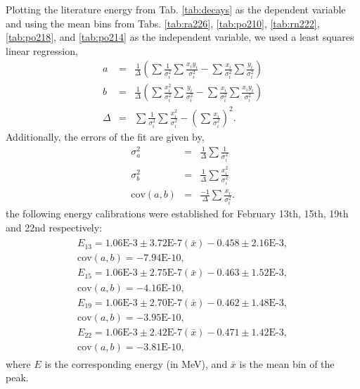 \documentclass[10pt]{IEEEtran}
\begin{document}
Plotting the literature energy from Tab. \ref{tab:decays} as the dependent variable and using the mean bins from Tabs. \ref{tab:ra226}, \ref{tab:po210}, \ref{tab:rn222}, \ref{tab:po218}, and \ref{tab:po214} as the independent variable, we used a least squares linear regression\cite{bevington},
\begin{eqnarray}
a &=& \frac{1}{\Delta}\left(\sum\frac{1}{\sigma_i^2}\sum\frac{x_i y_i}{\sigma_i^2}-\sum \frac{x_i}{\sigma_i^2}\sum\frac{y_i}{\sigma_i^2}\right) \\
b &=& \frac{1}{\Delta}\left(\sum\frac{x_i^2}{\sigma_i^2}\sum\frac{y_i}{\sigma_i^2}-\sum\frac{x_i}{\sigma_i^2}\sum\frac{x_i y_i}{\sigma_i^2}\right) \\
\Delta &=& \sum\frac{1}{\sigma_i^2}\sum\frac{x_i^2}{\sigma_i^2}-\left(\sum\frac{x_i}{\sigma_i^2}\right)^2.
\end{eqnarray}
Additionally, the errors of the fit are given by\cite{bevington},
\begin{eqnarray}
\sigma_a^2 &=& \frac{1}{\Delta}\sum\frac{1}{\sigma_i^2} \\
\sigma_b^2 &=& \frac{1}{\Delta}\sum\frac{x_i^2}{\sigma_i^2} \\
\text{cov}(a,b) &=& \frac{-1}{\Delta}\sum\frac{x_i}{\sigma_i^2}.
\end{eqnarray}
the following energy calibrations were established for February 13th, 15th, 19th and 22nd respectively:
\begin{eqnarray}\begin{array}{c}
E_{13} = 1.06\text{E-}3\pm 3.72\text{E-}7(\bar{x})-0.458\pm 2.16\text{E-}3, \\
\text{cov}(a,b) = -7.94\text{E-}10, \\
E_{15} = 1.06\text{E-}3\pm 2.75\text{E-}7(\bar{x})-0.463\pm 1.52\text{E-}3, \\
\text{cov}(a,b) = -4.16\text{E-}10, \\
E_{19} = 1.06\text{E-}3\pm 2.70\text{E-}7(\bar{x})-0.462\pm 1.48\text{E-}3, \\
\text{cov}(a,b) = -3.95\text{E-}10, \\
E_{22} = 1.06\text{E-}3\pm 2.42\text{E-}7(\bar{x})-0.471\pm 1.42\text{E-}3, \\
\text{cov}(a,b) = -3.81\text{E-}10,
\end{array}
\end{eqnarray}
where $E$ is the corresponding energy (in MeV), and $\bar{x}$ is the mean bin of the peak.
\end{document}
